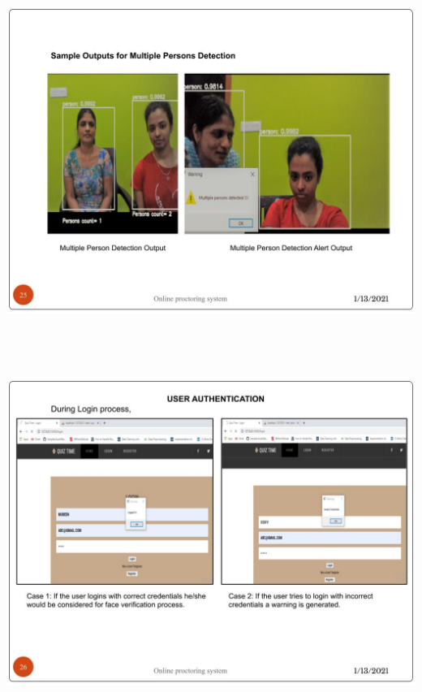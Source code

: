 \documentclass[12pt]{report}
\begin{document}
\includegraphics[width=17cm,height=12cm]{INTERNSHIP SAMPLE PRESENTATION (24)}\\
\includegraphics[width=17cm,height=12cm]{INTERNSHIP SAMPLE PRESENTATION (25)}\\
\end{document}
